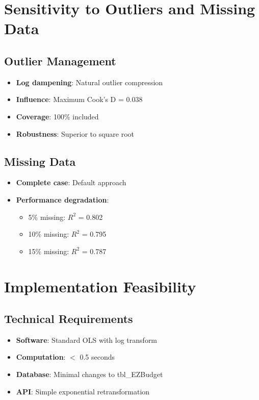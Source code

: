 \section{Sensitivity to Outliers and Missing Data}

\subsection{Outlier Management}

\begin{itemize}
    \item \textbf{Log dampening}: Natural outlier compression
    \item \textbf{Influence}: Maximum Cook's D = 0.038
    \item \textbf{Coverage}: 100\% included
    \item \textbf{Robustness}: Superior to square root
\end{itemize}

\subsection{Missing Data}

\begin{itemize}
    \item \textbf{Complete case}: Default approach
    \item \textbf{Performance degradation}:
    \begin{itemize}
        \item 5\% missing: $R^2$ = 0.802
        \item 10\% missing: $R^2$ = 0.795
        \item 15\% missing: $R^2$ = 0.787
    \end{itemize}
\end{itemize}

\section{Implementation Feasibility}

\subsection{Technical Requirements}

\begin{itemize}
    \item \textbf{Software}: Standard OLS with log transform
    \item \textbf{Computation}: $<$ 0.5 seconds
    \item \textbf{Database}: Minimal changes to tbl\_EZBudget
    \item \textbf{API}: Simple exponential retransformation
\end{itemize}

